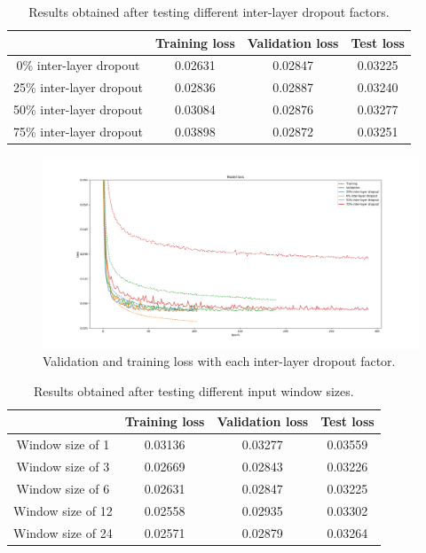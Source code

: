 \documentclass[]{article}
\begin{document}
	\begin{table}[H]
		\centering
		\begin{tabular}{@{}cccc@{}}
			\toprule
			& Training loss & Validation loss & Test loss \\ \midrule
			0\% inter-layer dropout  & 0.02631       & 0.02847         & 0.03225   \\
			25\% inter-layer dropout & 0.02836       & 0.02887         & 0.03240   \\
			50\% inter-layer dropout & 0.03084       & 0.02876         & 0.03277   \\
			75\% inter-layer dropout & 0.03898       & 0.02872         & 0.03251   \\ \bottomrule
		\end{tabular}
		\caption{Results obtained after testing different inter-layer dropout factors.}
		\label{t:sites_3}
	\end{table}
	
	\begin{figure}[H]
		\centering
		\includegraphics[width=\textwidth]{sites_3}
		\caption{Validation and training loss with each inter-layer dropout factor.}
		\label{f:sites_3}
	\end{figure}
	
	\begin{table}[H]
		\centering
		\begin{tabular}{@{}cccc@{}}
			\toprule
			& Training loss & Validation loss & Test loss \\ \midrule
			Window size of 1  & 0.03136       & 0.03277         & 0.03559   \\
			Window size of 3  & 0.02669       & 0.02843         & 0.03226   \\
			Window size of 6  & 0.02631       & 0.02847         & 0.03225   \\
			Window size of 12 & 0.02558       & 0.02935         & 0.03302   \\
			Window size of 24 & 0.02571       & 0.02879         & 0.03264   \\ \bottomrule
		\end{tabular}
		\caption{Results obtained after testing different input window sizes.}
		\label{t:sites_4}
	\end{table}
	
\end{document}
